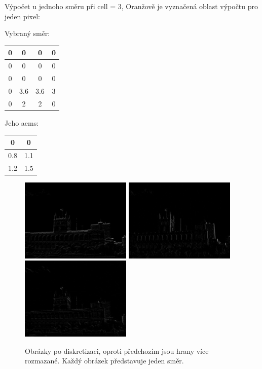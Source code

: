 \documentclass{report}
\begin{document}
Výpočet u jednoho směru při cell = 3, Oranžově je vyznačená oblast výpočtu pro jeden pixel:
\begin{multicols}{2}
	Vybraný směr:
 	\begin{center}
  		\begin{tabular}{ | c | c | c | c | }
    		\hline
    		0 & 0 & 0 & 0 \\ \hline
    		\cellcolor{orange!50}0 & \cellcolor{orange!50}0 & \cellcolor{orange!50}0 & 0 \\ \hline
    		\cellcolor{orange!50}0 & \cellcolor{orange!50}0 & \cellcolor{orange!50}0 & 0 \\ \hline
    		\cellcolor{orange!50}0 & \cellcolor{orange!50}3.6 & \cellcolor{orange!50}3.6 & 3 \\ \hline
    		0 & 2 & 2 & 0 \\
    		\hline
  		\end{tabular}
  	\end{center}
  	Jeho aems: 
  	\begin{center}
  		\begin{tabular}{ | c | c | }
    		\hline
    		0 & 0 \\ \hline
    		\cellcolor{orange!50}0.8 & 1.1 \\ \hline
    		1.2 & 1.5 \\
    		\hline
  		\end{tabular}
  	\end{center} 	
\end{multicols}

\begin{figure}[H]
	\centering
	\includegraphics[width=150pt]{./img/aems0.jpg}
	\includegraphics[width=150pt]{./img/aems1.jpg}
	\includegraphics[width=150pt]{./img/aems2.jpg}
	\caption{Obrázky po diskretizaci, oproti předchozím jsou hrany více rozmazané. Každý obrázek představuje jeden směr.}
\end{figure}
\end{document}
